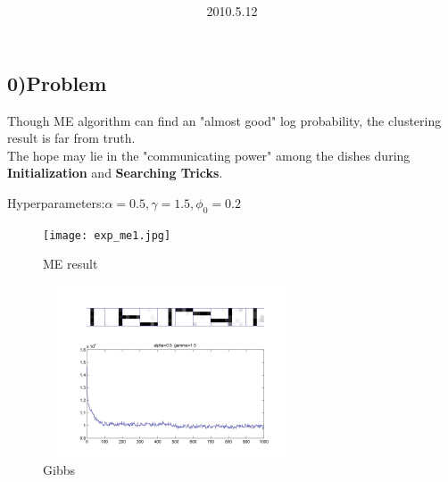 \documentclass{article}
\title{\vspace{0.3in}\textmd{\textbf{\hmwkTitle}}}
\date{2010.5.12}
\author{\textbf{\hmwkAuthorName}}
\begin{document}
\begin{spacing}{1.1}
\maketitle

\section{0)Problem}
Though ME algorithm can find an "almost good" log probability, the clustering result is far from truth. \\
The hope may lie in the "communicating power" among the dishes during {\bf Initialization} and {\bf Searching Tricks}.

Hyperparameters:$\alpha=0.5,\gamma=1.5,\phi_{0}=0.2$\\
\begin{figure}[h] 
  \begin{minipage}[b]{0.5\textwidth} 
    \centering 
    \texttt{[image: exp\_me1.jpg]} 
    \caption{ME result} 
    \label{fig:by:table} 
  \end{minipage}%
  \begin{minipage}[b]{0.5\textwidth} 
    \centering 
    \includegraphics[width=3in,height=2in]{exp_gib.jpg} 
    \caption{Gibbs}
    \label{fig:by:table}  
   \end{minipage}%
\end{figure}


\end{spacing}
\end{document}
